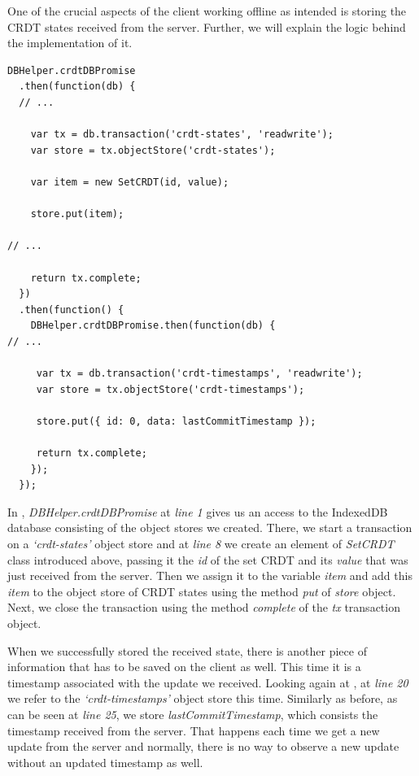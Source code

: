 One of the crucial aspects of the client working offline as intended is storing the CRDT states received from the server. Further, we will explain the logic behind the implementation of it.

\begin{lstlisting}[caption={[Caching on a client side CRDT states, received from the server]Storing CRDT states in the local database after a successful request from the server.}, label={lst:dev9}]
DBHelper.crdtDBPromise
  .then(function(db) {
  // ...

    var tx = db.transaction('crdt-states', 'readwrite');
    var store = tx.objectStore('crdt-states');

    var item = new SetCRDT(id, value);

    store.put(item);

// ...

    return tx.complete;
  })
  .then(function() {
    DBHelper.crdtDBPromise.then(function(db) {
// ...

     var tx = db.transaction('crdt-timestamps', 'readwrite');
     var store = tx.objectStore('crdt-timestamps');
     
     store.put({ id: 0, data: lastCommitTimestamp });

     return tx.complete;
    });
  });
\end{lstlisting}

In , \textit{DBHelper.crdtDBPromise} at \textit{line 1} gives us an access to the IndexedDB database consisting of the object stores we created. There, we start a transaction on a \textit{`crdt-states'} object store and at \textit{line 8} we create an element of \textit{SetCRDT} class introduced above, passing it the \textit{id} of the set CRDT and its \textit{value} that was just received from the server. Then we assign it to the variable \textit{item} and add this \textit{item} to the object store of CRDT states using the method \textit{put} of \textit{store} object. Next, we close the transaction using the method \textit{complete} of the \textit{tx} transaction object.

When we successfully stored the received state, there is another piece of information that has to be saved on the client as well. This time it is a timestamp associated with the update we received. Looking again at , at \textit{line 20} we refer to the \textit{`crdt-timestamps'} object store this time. Similarly as before, as can be seen at \textit{line 25}, we store \textit{lastCommitTimestamp}, which consists the timestamp received from the server. That happens each time we get a new update from the server and normally, there is no way to observe a new update without an updated timestamp as well.


